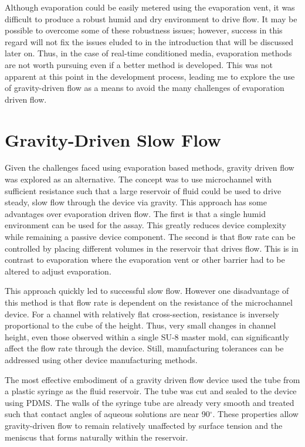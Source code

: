 Although evaporation could be easily metered using the evaporation vent, it was difficult to produce a robust humid and dry environment to drive flow. It may be possible to overcome some of these robustness issues; however, success in this regard will not fix the issues eluded to in the introduction that will be discussed later on. Thus, in the case of real-time conditioned media, evaporation methods are not worth pursuing even if a better method is developed. This was not apparent at this point in the development process, leading me to explore the use of gravity-driven flow as a means to avoid the many challenges of evaporation driven flow.

\section{Gravity-Driven Slow Flow}
Given the challenges faced using evaporation based methods, gravity driven flow was explored as an alternative. The concept was to use microchannel with sufficient resistance such that a large reservoir of fluid could be used to drive steady, slow flow through the device via gravity. This approach has some advantages over evaporation driven flow. The first is that a single humid environment can be used for the assay. This greatly reduces device complexity while remaining a passive device component. The second is that flow rate can be controlled by placing different volumes in the reservoir that drives flow. This is in contrast to evaporation where the evaporation vent or other barrier had to be altered to adjust evaporation.

This approach quickly led to successful slow flow. However one disadvantage of this method is that flow rate is dependent on the resistance of the microchannel device. For a channel with relatively flat cross-section, resistance is inversely proportional to the cube of the height. Thus, very small changes in channel height, even those observed within a single SU-8 master mold, can significantly affect the flow rate through the device. Still, manufacturing tolerances can be addressed using other device manufacturing methods. 

The most effective embodiment of a gravity driven flow device used the tube from a plastic syringe as the fluid reservoir. The tube was cut and sealed to the device using PDMS. The walls of the syringe tube are already very smooth and treated such that contact angles of aqueous solutions are near 90$^{\circ}$. These properties allow gravity-driven flow to remain relatively unaffected by surface tension and the meniscus that forms naturally within the reservoir.


